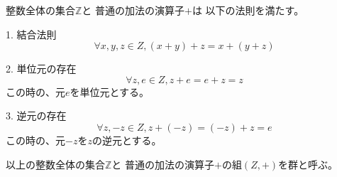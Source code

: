 \documentclass{jsarticle}
\begin{document}
整数全体の集合$\mathbb{Z}$と
普通の加法の演算子$+$は 以下の法則を満たす。

1. 結合法則
\begin{equation}
    \forall x,y,z \in Z, (x + y) + z = x + (y + z)
\end{equation}

2. 単位元の存在
\begin{equation}
    \forall z, e \in Z, z + e = e + z = z
\end{equation}
この時の、元$e$を単位元とする。

3. 逆元の存在
\begin{equation}
    \forall z,-z \in Z, z + (-z) = (-z) + z = e
\end{equation}
この時の、元$-z$を$z$の逆元とする。

以上の整数全体の集合$\mathbb{Z}$と
普通の加法の演算子$+$の組$(Z,+)$を群と呼ぶ。
\end{document}
